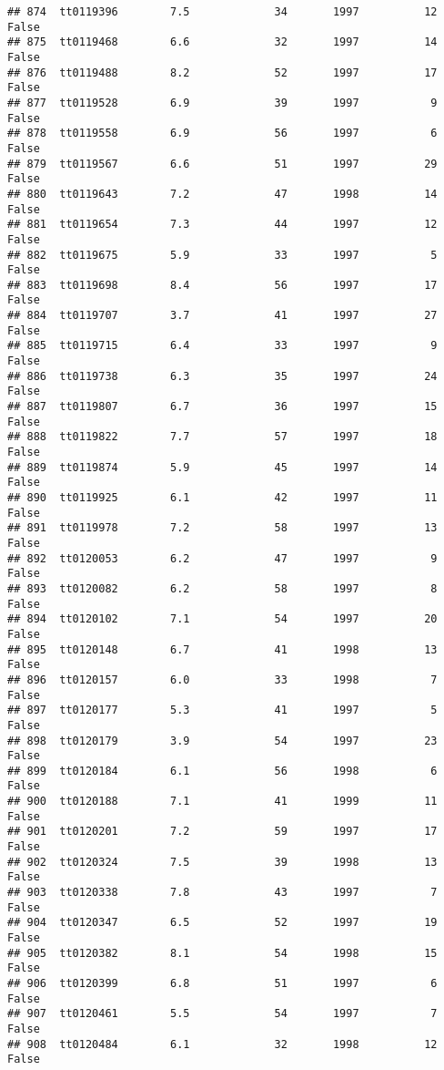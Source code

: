 \documentclass[
]{article}
\begin{document}
\begin{verbatim}
## 874  tt0119396        7.5             34       1997          12   False
## 875  tt0119468        6.6             32       1997          14   False
## 876  tt0119488        8.2             52       1997          17   False
## 877  tt0119528        6.9             39       1997           9   False
## 878  tt0119558        6.9             56       1997           6   False
## 879  tt0119567        6.6             51       1997          29   False
## 880  tt0119643        7.2             47       1998          14   False
## 881  tt0119654        7.3             44       1997          12   False
## 882  tt0119675        5.9             33       1997           5   False
## 883  tt0119698        8.4             56       1997          17   False
## 884  tt0119707        3.7             41       1997          27   False
## 885  tt0119715        6.4             33       1997           9   False
## 886  tt0119738        6.3             35       1997          24   False
## 887  tt0119807        6.7             36       1997          15   False
## 888  tt0119822        7.7             57       1997          18   False
## 889  tt0119874        5.9             45       1997          14   False
## 890  tt0119925        6.1             42       1997          11   False
## 891  tt0119978        7.2             58       1997          13   False
## 892  tt0120053        6.2             47       1997           9   False
## 893  tt0120082        6.2             58       1997           8   False
## 894  tt0120102        7.1             54       1997          20   False
## 895  tt0120148        6.7             41       1998          13   False
## 896  tt0120157        6.0             33       1998           7   False
## 897  tt0120177        5.3             41       1997           5   False
## 898  tt0120179        3.9             54       1997          23   False
## 899  tt0120184        6.1             56       1998           6   False
## 900  tt0120188        7.1             41       1999          11   False
## 901  tt0120201        7.2             59       1997          17   False
## 902  tt0120324        7.5             39       1998          13   False
## 903  tt0120338        7.8             43       1997           7   False
## 904  tt0120347        6.5             52       1997          19   False
## 905  tt0120382        8.1             54       1998          15   False
## 906  tt0120399        6.8             51       1997           6   False
## 907  tt0120461        5.5             54       1997           7   False
## 908  tt0120484        6.1             32       1998          12   False

\end{verbatim}
\end{document}
